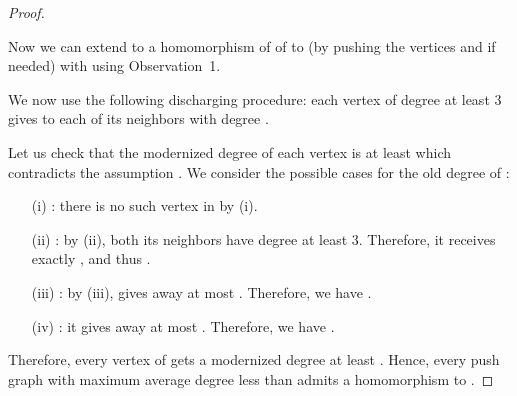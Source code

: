 \documentclass[10pt]{article}
\begin{document}
\begin{proof}
\begin{itemize}
Now we can extend  to a homomorphism 
of  of  to   (by pushing the vertices  and  if needed) with  using 
 Observation~1.

\end{itemize}

We now use the following discharging procedure: each vertex of degree at least
3 gives  
to each of its neighbors with degree .

Let us check that the modernized degree  of each vertex  is at least  which
contradicts the assumption . We consider the possible cases for the old
degree  of :

\begin{itemize}

\item[(i)]  : there is no such vertex in  by (i).

\item[(ii)]: by (ii), both its neighbors have degree at least 3. Therefore, it receives 
exactly
, and thus .


\item[(iii)] : by  (iii),  gives away at most . Therefore, we have 
 .


 \item[(iv)] :  it gives away at most . Therefore, we have 
 .

\end{itemize} 
 
 
 Therefore, every vertex of  gets a modernized degree at least . Hence, every push graph with maximum average degree less than  admits a homomorphism to . 

\end{proof}








 
 
\end{document}
